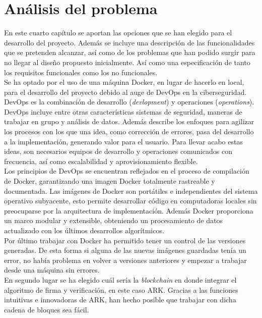 \chapter{Análisis del problema}

En este cuarto capítulo se aportan las opciones que se han elegido para el desarrollo del proyecto. Además se incluye una descripción de las funcionalidades que se pretenden alcanzar, así como de los problemas que han podido surgir para no llegar al diseño propuesto inicialmente. Así como una especificación de tanto los requisitos funcionales como los no funcionales.\\

Se ha optado por el uso de una máquina Docker, en lugar de hacerlo en local, para el desarrollo del proyecto debido al auge de DevOps en la ciberseguridad.\\

DevOps es la combinación de desarrollo (\textit{devlopment}) y operaciones (\textit{operations})\cite{devops-redhat}. DevOps incluye entre otras características sistemas de seguridad, maneras de trabajar en grupo y análisis de datos. Además describe los enfoques para agilizar los procesos con los que una idea, como corrección de errores, pasa del desarrollo a la implementación, generando valor para el usuario. Para llevar acabo estas ideas, son necesarios equipos de desarrollo y operaciones comunicados con frecuencia, así como escalabilidad y aprovisionamiento flexible.\\

Los principios de DevOps se encuentran reflejados en el proceso de compilación de Docker, garantizando una imagen Docker totalmente rastreable y documentada. Las imágenes de Docker son portátiles e independientes del sistema operativo subyacente, esto permite desarrollar código en computadoras locales sin preocuparse por la arquitectura de implementación. Además Docker proporciona un marco modular y extensible, obteniendo un procesamiento de datos actualizado con los últimos desarrollos algorítmicos\cite{docker-devops}.\\

Por último trabajar con Docker ha permitido tener un control de las versiones generadas. De esta forma si alguna de las nuevas imágenes guardadas tenía un error, no había problema en volver a versiones anteriores y empezar a trabajar desde una máquina sin errores.\\

En segundo lugar se ha elegido cuál sería la \textit{blockchain} en donde integrar el algoritmo de firma y verificación, en este caso ARK. Gracias a las funciones intuitivas e innovadoras de ARK, han hecho posible que trabajar con dicha cadena de bloques sea fácil.\\

